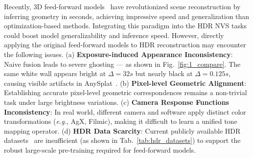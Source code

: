 \documentclass[runningheads]{llncs}
\begin{document}
Recently, 3D feed-forward  models~\cite{wang2025vggt,jiang2025anysplat} have revolutionized scene reconstruction by inferring geometry in seconds, achieving impressive speed and generalization than optimization-based methods. Integrating this paradigm into the HDR NVS tasks could boost model generalizability and inference speed.
However, directly applying the original feed-forward models to HDR reconstruction may encounter the following issues. 
(a) \textbf{Exposure-induced Appearance Inconsistency}: 
Naive fusion leads to severe ghosting — as shown in Fig.~\ref{fig:1_compare}. The same white wall appears bright at $\Delta=32s$ but nearly black at $\Delta=0.125s$, causing visible artifacts in AnySplat~\cite{jiang2025anysplat}.
(b) \textbf{Pixel-level Geometric Alignment}: 
Establishing accurate pixel-level geometric correspondences remains a non-trivial task under large brightness variations.
(c) \textbf{Camera Response Functions Inconsistency}: 
In real world, different camera and software apply distinct color transformations (\textit{e.g.}, AgX, Filmic), making it difficult to learn a unified tone mapping operator.
(d) \textbf{HDR Data Scarcity}: Current publicly available HDR datasets~\cite{huang2022hdr,jun2022hdr} are insufficient (as shown in Tab.~\ref{tab:hdr_datasets}) to support the robust large-scale pre-training required for feed-forward models.

\end{document}
